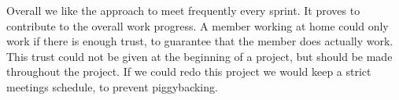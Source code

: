 Overall we like the approach to meet frequently every sprint. It proves to contribute to the overall work progress. A member working at home could only work if there is enough trust, to guarantee that the member does actually work. This trust could not be given at the beginning of a project, but should be made throughout the project. If we could redo this project we would keep a strict meetings schedule, to prevent piggybacking.




